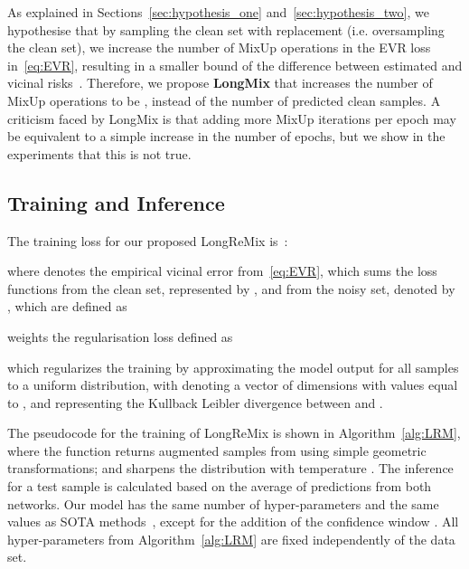 \documentclass[review]{elsarticle}
\begin{document}
As explained in Sections~\ref{sec:hypothesis_one} and~\ref{sec:hypothesis_two},
we hypothesise that by sampling the clean set with replacement (i.e. oversampling the clean set), we increase the number of MixUp operations in the EVR loss in~\eqref{eq:EVR}, resulting in a smaller bound of the difference between estimated and vicinal risks~\cite{zhang2018generalization}.  
Therefore, we propose \textbf{LongMix} that increases the number of MixUp operations to be , instead of the number of predicted clean samples. 
A criticism faced by LongMix is that adding more MixUp iterations per epoch may be equivalent to a simple increase in the number of epochs, but we show in the experiments that this is not true.


\subsection{Training and Inference}



The training loss for our proposed LongReMix is~\cite{li2020dividemix}:

where  denotes the empirical vicinal error from~\eqref{eq:EVR}, which sums the loss functions from the clean set, represented by , and from the noisy set, denoted by , which are defined as

 weights the regularisation loss defined as

which regularizes the training by approximating the model output for all samples to a uniform distribution, with  denoting a vector of  dimensions with values equal to , and 
 representing the Kullback Leibler divergence between  and .


The pseudocode for the training of LongReMix is shown in Algorithm~\ref{alg:LRM}, where the function  returns  augmented samples from  using simple geometric transformations; and 
 sharpens the distribution  with temperature .
The inference for a test sample is calculated based on the average of predictions from both networks. Our model has the same number of hyper-parameters and the same values as SOTA methods~\cite{li2020dividemix}, except for the addition of the confidence window . All hyper-parameters from Algorithm~\ref{alg:LRM} are fixed independently of the data set.
\end{document}
